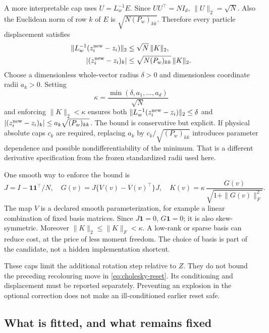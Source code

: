 \documentclass[11pt,a4paper]{article}
\newcommand{\one}{\mathbf 1}
\begin{document}
A more interpretable cap uses \(U=L_w^{-1}E\). Since \(UU^\top=NI_d\),
\(\|U\|_2=\sqrt N\). Also the Euclidean norm of row \(k\) of \(E\) is
\(\sqrt{N(P_w)_{kk}}\). Therefore every particle displacement satisfies
\begin{align}
\label{eq:dual-caps}
 \|L_w^{-1}(z_i^{\rm new}-z_i)\|_2
       &\leq\sqrt N\,\|K\|_2,\\
 |(z_i^{\rm new}-z_i)_k|
       &\leq\sqrt{N(P_w)_{kk}}\,\|K\|_2 .
 \nonumber
\end{align}
Choose a dimensionless whole-vector radius \(\delta>0\) and dimensionless
coordinate radii \(a_k>0\). Setting
\begin{equation}
\label{eq:kappa}
 \kappa=\frac{\min(\delta,a_1,\ldots,a_d)}{\sqrt N}
\end{equation}
and enforcing \(\|K\|_2<\kappa\) ensures both
\(\|L_w^{-1}(z_i^{\rm new}-z_i)\|_2\leq\delta\) and
\(|(z_i^{\rm new}-z_i)_k|\leq a_k\sqrt{(P_w)_{kk}}\).
The bound is conservative but explicit. If physical absolute caps \(c_k\)
are required, replacing \(a_k\) by \(c_k/\sqrt{(P_w)_{kk}}\) introduces
parameter dependence and possible nondifferentiability of the minimum.
That is a different derivative specification from the frozen standardized
radii used here.

One smooth way to enforce the bound is
\begin{equation}
\label{eq:bounded-skew}
 J=I-\one\one^\top/N,\quad
 G(v)=J\{V(v)-V(v)^\top\}J,\quad
 K(v)=\kappa\,\frac{G(v)}{\sqrt{1+\|G(v)\|_F^2}} .
\end{equation}
The map \(V\) is a declared smooth parameterization, for example a linear
combination of fixed basis matrices. Since \(J\one=0\), \(G\one=0\);
it is also skew-symmetric. Moreover
\(\|K\|_2\leq\|K\|_F<\kappa\).
A low-rank or sparse basis can reduce cost, at the price of less moment
freedom. The choice of basis is part of the candidate, not a hidden
implementation shortcut.

These caps limit the additional rotation step relative to \(Z\).
They do not bound the preceding recolouring move in
\eqref{eq:cholesky-reset}. Its conditioning and displacement must be
reported separately. Preventing an explosion in the optional correction
does not make an ill-conditioned earlier reset safe.

\subsection{What is fitted, and what remains fixed}
\end{document}
